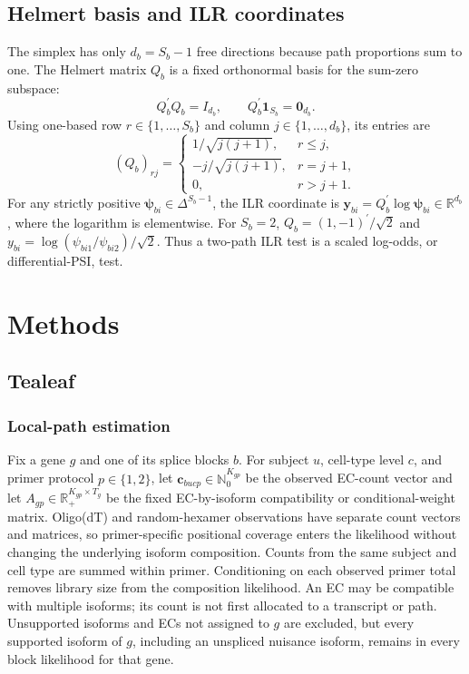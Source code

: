 \documentclass[11pt]{article}
\begin{document}
\subsection*{Helmert basis and ILR coordinates}

The simplex has only \(d_b=S_b-1\) free directions because path proportions sum to one. The Helmert matrix \(Q_b\) is a fixed orthonormal basis for the sum-zero subspace: \[
 Q_b^\prime Q_b=I_{d_b},\qquad Q_b^\prime\bm1_{S_b}=\bm0_{d_b}.
\]
Using one-based row \(r\in\{1,\ldots,S_b\}\) and column \(j\in\{1,\ldots,d_b\}\), its entries are \[
 (Q_b)_{rj}=
 \begin{cases}
  1/\sqrt{j(j+1)}, & r\leq j,\\
  -j/\sqrt{j(j+1)}, & r=j+1,\\
  0, & r>j+1.
 \end{cases}
\]
For any strictly positive \(\bm\psi_{bi}\in\Delta^{S_b-1}\), the ILR coordinate is \(\bm y_{bi}=Q_b^\prime\log\bm\psi_{bi}\in\mathbb R^{d_b}\), where the logarithm is elementwise. For \(S_b=2\), \(Q_b=(1,-1)^\prime/\sqrt2\) and \(y_{bi}=\log(\psi_{bi1}/\psi_{bi2})/\sqrt2\). Thus a two-path ILR test is a scaled log-odds, or differential-PSI, test.

\section*{Methods}

\subsection*{Tealeaf}

\subsubsection*{Local-path estimation}

Fix a gene \(g\) and one of its splice blocks \(b\). For subject \(u\), cell-type level \(c\), and primer protocol \(p\in\{1,2\}\), let \(\bm c_{bucp}\in\mathbb N_0^{K_{gp}}\) be the observed EC-count vector and let \(A_{gp}\in\mathbb R_+^{K_{gp}\times T_g}\) be the fixed EC-by-isoform compatibility or conditional-weight matrix. Oligo(dT) and random-hexamer observations have separate count vectors and matrices, so primer-specific positional coverage enters the likelihood without changing the underlying isoform composition. Counts from the same subject and cell type are summed within primer. Conditioning on each observed primer total removes library size from the composition likelihood. An EC may be compatible with multiple isoforms; its count is not first allocated to a transcript or path. Unsupported isoforms and ECs not assigned to \(g\) are excluded, but every supported isoform of \(g\), including an unspliced nuisance isoform, remains in every block likelihood for that gene.
\end{document}

